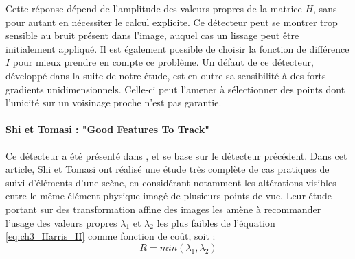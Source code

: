 Cette réponse dépend de l'amplitude des valeurs propres de la matrice $H$, sans pour autant en nécessiter le calcul explicite. Ce détecteur peut se montrer trop sensible au bruit présent dans l'image, auquel cas un lissage peut être initialement appliqué. Il est également possible de choisir la fonction de différence $I$ pour mieux prendre en compte ce problème. Un défaut de ce détecteur, développé dans la suite de notre étude, est en outre sa sensibilité à des forts gradients unidimensionnels. Celle-ci peut l'amener à sélectionner des points dont l'unicité sur un voisinage proche n'est pas garantie.

\paragraph{Shi et Tomasi : "Good Features To Track"\\}
Ce détecteur a été présenté dans \cite{Shi2002}, et se base sur le détecteur précédent. Dans cet article, Shi et Tomasi ont réalisé une étude très complète de cas pratiques de suivi d'éléments d'une scène, en considérant notamment les altérations visibles entre le même élément physique imagé de plusieurs points de vue. Leur étude portant sur des transformation affine des images les amène à recommander l'usage des valeurs propres  $\lambda_1$ et $\lambda_2$ les plus faibles de l'équation \ref{eq:ch3_Harris_H} comme fonction de coût, soit :
\begin{equation}
	R = min(\lambda_1, \lambda_2)
\end{equation}

